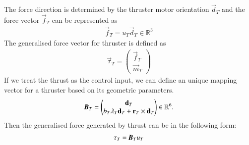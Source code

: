 The force direction is determined by the thruster motor orientation $\vec{d}_{T}$ and the force vector $\vec{f}_{T}$ can be represented as
\begin{align}
\vec{f}_{T}=u_{T}\vec{d}_{T} \in \mathbb{R}^{3}
\end{align}
The generalised force vector for thruster is defined as
\begin{align}
\vec{\tau}_{T}=\begin{pmatrix}
\vec{f}_{T} \\ \vec{m}_{T}
\end{pmatrix}
\end{align} 
If we treat the thrust as the control input, we can define an unique mapping vector for a thruster based on its geometric parameters.
\begin{align}
\emph{\textbf{B}}_{T}=
\begin{pmatrix}
\vec{d}_{T} \\
b_{T}\lambda_{T} \vec{d}_{T}+\vec{r}_{T}\times \vec{d}_{T}
\end{pmatrix} \in \mathbb{R}^{6}. \label{EQ:ThrusterMappingVector}
\end{align}
Then the generalised force generated by thrust can be in the following form:
\begin{align}
\vec{\tau}_{T}=\emph{\textbf{B}}_{T}u_{T}
\end{align}
 

